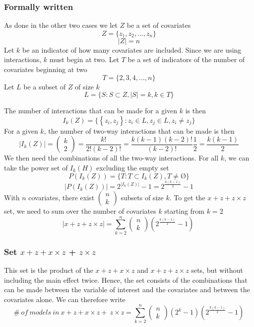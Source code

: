 \subsubsection{Formally written} As done in the other two cases we let $Z$ be a set of covariates 
\[Z=\{\left.z_1,z_2,\dots ,z_n\right.\}\] 
\[|Z|=n\] 
Let $k$ be an indicator of how many covariates are included. Since we are using interactions, $k$ must begin at two. Let $T$ be a set of indicators of the number of covariates beginning at two
\[T=\{\left.2,3,4,\dots ,n\right.\}\] 
Let $L$ be a subset of $Z$ of size $k$
\[L=\{\left.S:S\subset Z,\left|S\right|=k,k\in T\right.\}\] 

The number of interactions that can be made for a given $k$ is then
\[I_k\left(Z\right)=\{\left\{\left.z_i,z_j\right\}:z_i\in L,z_j\in L,z_i\neq z_j\right.\}\] 
For a given $k$, the number of two-way interactions that can be made is then
\[\left|I_k\left(Z\right)\right|=\left( \begin{array}{c}
k \\ 
2 \end{array}
\right)=\frac{k!}{2!\left(k-2\right)!}=\frac{k\left(k-1\right)\left(k-2\right)!}{\left(k-2\right)!}\frac{1}{2}=\frac{k\left(k-1\right)}{2}\] 
We then need the combinations of all the two-way interactions. For all $k$, we can take the power set of $I_k\left(H\right)$ excluding the empty set
\[P\left(I_k\left(Z\right)\right)=\{\left.T:T\subset I_k\left(Z\right),T\neq \textrm{\O}\right.\}\] 
\[\left|P\left(I_k\left(Z\right)\right)\right|=2^{\left|I_k\left(Z\right)\right|}-1=2^{\frac{k\left(k-1\right)}{2}}-1\] 
With $n$ covariates, there exist $\left( \begin{array}{c}
n \\ 
k \end{array}
\right)$ subsets of size $k$. To get the $x + z + z \times z$ set, we need to sum over the number of covariates $k$ starting from $k=2$
\[\left|x + z+z \times z\right|=\sum^n_{k=2}{\left( \begin{array}{c}
n \\ 
k \end{array}
\right)}\left(2^{\frac{k\left(k-1\right)}{2}}-1\right)\ \] 

\subsubsection{Set $x + z + x \times z$ + $z \times z$}
This set is the product of the $x + z + x \times z$ and $x + z + z \times z$ sets, but without including the main effect twice. Hence, the set consists of the combinations that can be made between the variable of interest and the covariates and between the covariates alone. We can therefore write 
\[\#\ of\ models\ in\ x + z + x \times z+\ z \times z=\sum^n_{k=2}{\left( \begin{array}{c}
n \\ 
k \end{array}
\right)\left(2^k-1\right)\left(2^{\frac{k\left(k-1\right)}{2}}-1\right)}\] 

